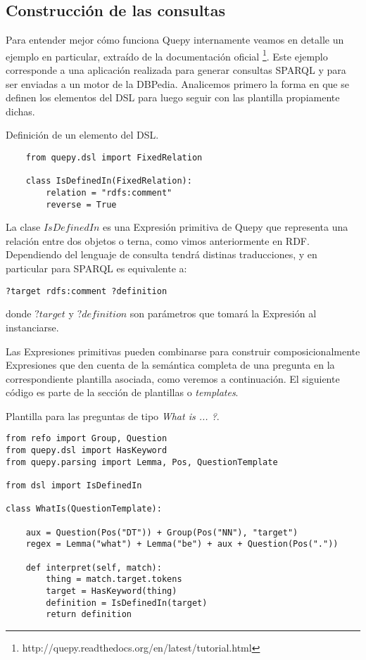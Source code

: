 \subsection{Construcción de las consultas}

Para entender mejor cómo funciona Quepy internamente veamos en detalle un ejemplo en particular, extraído de la documentación oficial \footnote{http://quepy.readthedocs.org/en/latest/tutorial.html}. Este ejemplo corresponde a una aplicación realizada para generar consultas SPARQL y para ser enviadas a un motor de la DBPedia. Analicemos primero la forma en que se definen los elementos del DSL para luego seguir con las plantilla propiamente dichas.

\begin{example}Definición de un elemento del DSL.
    \begin{lstlisting}
    from quepy.dsl import FixedRelation

    class IsDefinedIn(FixedRelation):
        relation = "rdfs:comment"
        reverse = True
    \end{lstlisting}
\end{example}

La clase $IsDefinedIn$ es una Expresión primitiva de Quepy que representa una relación entre dos objetos o terna, como vimos anteriormente en RDF. Dependiendo del lenguaje de consulta tendrá distinas traducciones, y en particular para SPARQL es equivalente a:

\begin{lstlisting}
?target rdfs:comment ?definition
\end{lstlisting}

donde $?target$ y $?definition$ son parámetros que tomará la Expresión al instanciarse.

Las Expresiones primitivas pueden combinarse para construir composicionalmente Expresiones que den cuenta de la semántica completa de una pregunta en la correspondiente plantilla asociada, como veremos a continuación. El siguiente código es parte de la sección de plantillas o \textit{templates}.

\begin{example}\label{plantilla-quepy} Plantilla para las preguntas de tipo \textit{What is ... ?}.
\begin{lstlisting}
from refo import Group, Question
from quepy.dsl import HasKeyword
from quepy.parsing import Lemma, Pos, QuestionTemplate

from dsl import IsDefinedIn

class WhatIs(QuestionTemplate):

    aux = Question(Pos("DT")) + Group(Pos("NN"), "target")
    regex = Lemma("what") + Lemma("be") + aux + Question(Pos("."))

    def interpret(self, match):
        thing = match.target.tokens
        target = HasKeyword(thing)
        definition = IsDefinedIn(target)
        return definition
\end{lstlisting}
\end{example}

